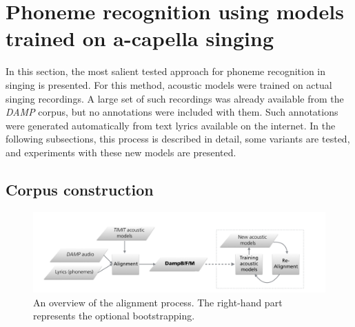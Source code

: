 \section{Phoneme recognition using models trained on a-capella singing} \label{sec:phonerec_acap}
In this section, the most salient tested approach for phoneme recognition in singing is presented. For this method, acoustic models were trained on actual singing recordings. A large set of such recordings was already available from the \textit{DAMP} corpus, but no annotations were included with them. Such annotations were generated automatically from text lyrics available on the internet. In the following subsections, this process is described in detail, some variants are tested, and experiments with these new models are presented. 

\subsection{Corpus construction}



\begin{figure}
 \begin{center}
                \includegraphics[width=.8\textwidth]{images/overview_bootstrap.png}
                \caption{An overview of the alignment process. The right-hand part represents the optional bootstrapping.}
                \label{fig:damp_alignment_process}
                 \end{center}
 \end{figure}
 
